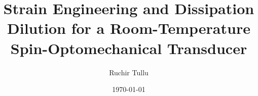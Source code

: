 \documentclass[%
 reprint,
nofootinbib,
 amsmath,amssymb,
 aps,
]{revtex4-2}
\begin{document}

\title{Strain Engineering and Dissipation Dilution for a Room-Temperature Spin-Optomechanical Transducer}%

\author{Ruchir Tullu}




\date{\today}%
\end{document}
